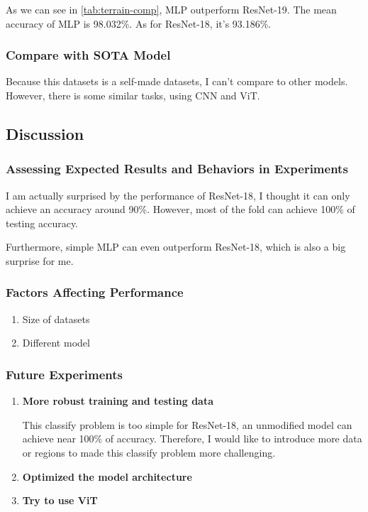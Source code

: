 \documentclass[twocolumn]{extarticle}
\begin{document}
As we can see in \autoref{tab:terrain-comp}, MLP outperform ResNet-19. The mean accuracy of MLP is 98.032\%. As for ResNet-18, it's 93.186\%. 

\subsubsection{Compare with SOTA Model}

Because this datasets is a self-made datasets, I can't compare to other models. However, there is some similar tasks, using CNN and ViT.

\subsection{Discussion}
\subsubsection{Assessing Expected Results and Behaviors in Experiments}

I am actually surprised by the performance of ResNet-18, I thought it can only achieve an accuracy around 90\%. However, most of the fold can achieve 100\% of testing accuracy.

Furthermore, simple MLP can even outperform ResNet-18, which is also a big surprise for me.

\subsubsection{Factors Affecting Performance}

\begin{enumerate}
\item Size of datasets
\item Different model
\end{enumerate}

\subsubsection{Future Experiments}

\begin{enumerate}
\item \textbf{More robust training and testing data}

This classify problem is too simple for ResNet-18, an unmodified model can achieve near 100\% of accuracy. Therefore, I would like to introduce more data or regions to made this classify problem more challenging.

\item \textbf{Optimized the model architecture}
\item \textbf{Try to use ViT}

\end{enumerate}
\end{document}
